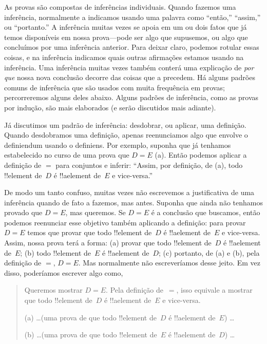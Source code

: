 \documentclass[../../../include/open-logic-section]{subfiles}
\begin{document}


As provas são compostas de inferências individuais. Quando fazemos uma
inferência, normalmente a indicamos usando uma palavra como ``então,''
``assim,'' ou ``portanto.''  A inferência muitas vezes se apoia em um ou dois
fatos que já temos disponíveis em nossa prova---pode ser algo que
supusemos, ou algo que concluímos por uma inferência
anterior.  Para deixar claro, podemos rotular essas coisas, e na inferência
indicamos quais outras afirmações estamos usando na inferência.  Uma
inferência muitas vezes também conterá uma explicação de \emph{por que} nossa nova
conclusão decorre das coisas que a precedem.  Há
alguns padrões comuns de inferência que são usados com muita frequência em provas;
percorreremos alguns deles abaixo. Alguns padrões de inferência, como as provas
por indução, são mais elaborados (e serão discutidos mais adiante).

Já discutimos um padrão de inferência: desdobrar, ou
aplicar, uma definição. Quando desdobramos uma definição, apenas reenunciamos
algo que envolve o definiendum usando o definiens. Por
exemplo, suponha que já tenhamos estabelecido no curso de uma
prova que $D = E$ (a). Então podemos aplicar a definição de $=$ para conjuntos
e inferir: ``Assim, por definição, de (a), todo !!{element}
de~$D$ é !!a{element} de~$E$ e vice-versa.''

De modo um tanto confuso, muitas vezes não escrevemos a justificativa de uma
inferência quando de fato a fazemos, mas antes.  Suponha que ainda não
tenhamos provado que $D = E$, mas queremos.  Se $D = E$ é a
conclusão que buscamos, então podemos reenunciar esse objetivo também aplicando
a definição: para provar $D = E$ temos que provar que todo
!!{element} de~$D$ é !!a{element} de~$E$ e vice-versa.  Assim, nossa
prova terá a forma: (a) provar que todo !!{element} de~$D$ é
!!a{element} de~$E$; (b) todo !!{element} de~$E$ é !!a{element}
de~$D$; (c) portanto, de (a) e (b), pela definição de $=$, $D = E$.
Mas normalmente não escreveríamos desse jeito. Em vez disso, poderíamos escrever
algo como,
\begin{quote}
Queremos mostrar $D = E$. Pela definição de~$=$, isso equivale a mostrar
que todo !!{element} de~$D$ é !!a{element} de~$E$ e vice-versa.

(a) \dots (uma prova de que todo !!{element} de~$D$ é !!a{element}
de~$E$) \dots

(b) \dots (uma prova de que todo !!{element}
de~$E$ é !!a{element} de~$D$) \dots
\end{quote}
\end{document}
